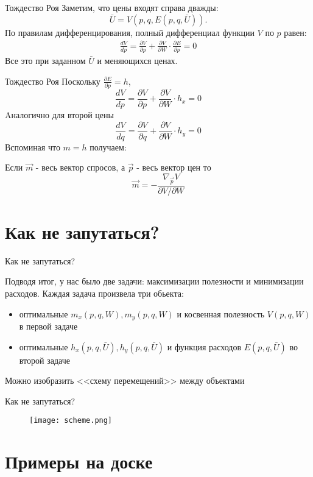 \documentclass{beamer}
\begin{document}

\begin{frame}{Тождество Роя}
Заметим, что цены входят справа дважды:
$$\bar U = V(p, q, E(p,q, \bar U)).$$
По правилам дифференцирования, полный дифференциал функции $V$ по $p$ равен:
\begin{gather*}
\frac{d V}{d p} = \frac{\partial V}{\partial p} + \frac{\partial V}{\partial W} \cdot \frac{\partial E}{\partial p} = 0
\end{gather*}
Все это при заданном $\bar U$ и меняющихся ценах.
\end{frame}

\begin{frame}{Тождество Роя}
Поскольку $\frac{\partial E}{\partial p} = h$, 
$$\frac{d V}{d p} = \frac{\partial V}{\partial p} + \frac{\partial V}{\partial W} \cdot h_x = 0$$
Aналогично для второй цены
$$\frac{d V}{d q} = \frac{\partial V}{\partial q} + \frac{\partial V}{\partial W} \cdot h_y = 0$$
Вспоминая что $m = h$ получаем:

\begin{theorem}
Если $\vec{m}$ - весь вектор спросов, а $\vec{p}$ - весь вектор цен то
$$\vec{m} = - \frac{\nabla_{\vec{p}} V}{\partial V / \partial W } $$
\end{theorem}

\end{frame}

\section{Как не запутаться?}

\begin{frame}{Как не запутаться?}

Подводя итог, у нас было две задачи: максимизации полезности и минимизации расходов.
Каждая задача произвела три обьекта:

\begin{itemize}
\item оптимальные $m_x(p,q,W), m_y(p,q,W)$ и косвенная полезность $V(p,q,W)$ в первой задаче
\item оптимальные $h_x(p,q,\bar U), h_y(p,q,\bar U)$ и функция расходов $E(p,q,\bar U)$ во второй задаче
\end{itemize}
Можно изобразить <<схему перемещений>> между объектами

\end{frame}

\begin{frame}{Как не запутаться?}

\begin{figure}[hbt]
\centering
\texttt{[image: scheme.png]}
\end{figure}

\end{frame}

\section{Примеры на доске}
\end{document}
